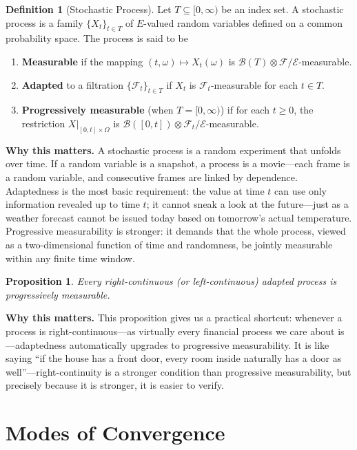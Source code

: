\documentclass[11pt,a4paper,openany]{book}
\theoremstyle{definition}
\newtheorem{definition}{Definition}[chapter]
\theoremstyle{plain}
\newtheorem{proposition}[theorem]{Proposition}
\theoremstyle{remark}
\newcommand{\1}{\mathbbm{1}}
\newcommand{\F}{\mathcal{F}}
\newcommand{\B}{\mathcal{B}}
\newcommand{\calE}{\mathcal{E}}
\begin{document}
\begin{definition}[Stochastic Process]
Let $T \subseteq [0, \infty)$ be an index set. A stochastic process is a family $\{X_{t}\}_{t \in T}$ of $E$-valued random variables defined on a common probability space. The process is said to be
\begin{enumerate}[label=(\arabic*)]
    \item \textbf{Measurable} if the mapping $(t, \omega) \mapsto X_{t}(\omega)$ is $\B(T) \otimes \F / \calE$-measurable.
    \item \textbf{Adapted} to a filtration $\{\F_{t}\}_{t \in T}$ if $X_{t}$ is $\F_{t}$-measurable for each $t \in T$.
    \item \textbf{Progressively measurable} (when $T = [0, \infty)$) if for each $t \geq 0$, the restriction $X|_{[0,t] \times \Omega}$ is $\B([0,t]) \otimes \F_{t} / \calE$-measurable.
\end{enumerate}
\end{definition}

\medskip
\noindent\textbf{Why this matters.} A stochastic process is a random experiment that unfolds over time. If a random variable is a snapshot, a process is a movie---each frame is a random variable, and consecutive frames are linked by dependence. Adaptedness is the most basic requirement: the value at time $t$ can use only information revealed up to time $t$; it cannot sneak a look at the future---just as a weather forecast cannot be issued today based on tomorrow's actual temperature. Progressive measurability is stronger: it demands that the whole process, viewed as a two-dimensional function of time and randomness, be jointly measurable within any finite time window.

\begin{proposition}
Every right-continuous (or left-continuous) adapted process is progressively measurable.
\end{proposition}

\medskip
\noindent\textbf{Why this matters.} This proposition gives us a practical shortcut: whenever a process is right-continuous---as virtually every financial process we care about is---adaptedness automatically upgrades to progressive measurability. It is like saying ``if the house has a front door, every room inside naturally has a door as well''---right-continuity is a stronger condition than progressive measurability, but precisely because it is stronger, it is easier to verify.

\section{Modes of Convergence}
\end{document}
